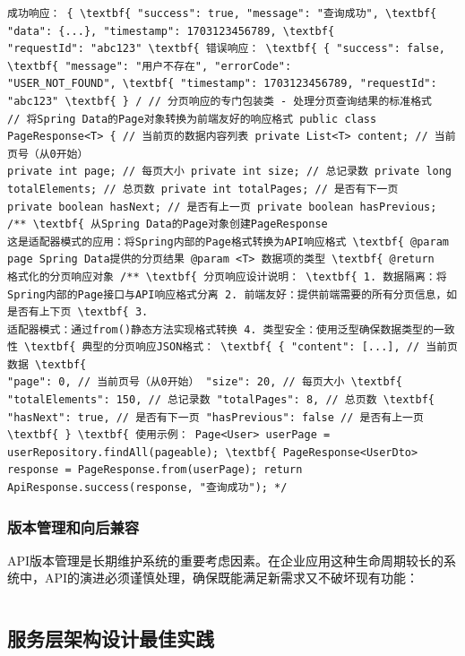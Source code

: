 {{{{{{{{{{{{{{\begin{lstlisting}
成功响应： { \textbf{ "success": true, "message": "查询成功", \textbf{ "data": {...}, "timestamp": 1703123456789, \textbf{
"requestId": "abc123" \textbf{ 错误响应： \textbf{ { "success": false, \textbf{ "message": "用户不存在", "errorCode":
"USER_NOT_FOUND", \textbf{ "timestamp": 1703123456789, "requestId": "abc123" \textbf{ } / // 分页响应的专门包装类 - 处理分页查询结果的标准格式
// 将Spring Data的Page对象转换为前端友好的响应格式 public class PageResponse<T> { // 当前页的数据内容列表 private List<T> content; // 当前页号（从0开始）
private int page; // 每页大小 private int size; // 总记录数 private long totalElements; // 总页数 private int totalPages; // 是否有下一页
private boolean hasNext; // 是否有上一页 private boolean hasPrevious; /** \textbf{ 从Spring Data的Page对象创建PageResponse
这是适配器模式的应用：将Spring内部的Page格式转换为API响应格式 \textbf{ @param page Spring Data提供的分页结果 @param <T> 数据项的类型 \textbf{ @return
格式化的分页响应对象 /** \textbf{ 分页响应设计说明： \textbf{ 1. 数据隔离：将Spring内部的Page接口与API响应格式分离 2. 前端友好：提供前端需要的所有分页信息，如是否有上下页 \textbf{ 3.
适配器模式：通过from()静态方法实现格式转换 4. 类型安全：使用泛型确保数据类型的一致性 \textbf{ 典型的分页响应JSON格式： \textbf{ { "content": [...], // 当前页数据 \textbf{
"page": 0, // 当前页号（从0开始） "size": 20, // 每页大小 \textbf{ "totalElements": 150, // 总记录数 "totalPages": 8, // 总页数 \textbf{
"hasNext": true, // 是否有下一页 "hasPrevious": false // 是否有上一页 \textbf{ } \textbf{ 使用示例： Page<User> userPage =
userRepository.findAll(pageable); \textbf{ PageResponse<UserDto> response = PageResponse.from(userPage); return
ApiResponse.success(response, "查询成功"); */ \end{lstlisting}
\subsubsection{版本管理和向后兼容}\label{ux7248ux672cux7ba1ux7406ux548cux5411ux540eux517cux5bb9}
API版本管理是长期维护系统的重要考虑因素。在企业应用这种生命周期较长的系统中，API的演进必须谨慎处理，确保既能满足新需求又不破坏现有功能： \begin{lstlisting}[language=Java]
\end{lstlisting} \subsection{服务层架构设计最佳实践}\label{ux670dux52a1ux5c42ux67b6ux6784ux8bbeux8ba1ux6700ux4f73ux5b9eux8df5}
}}}}}}}}}}}}}}
